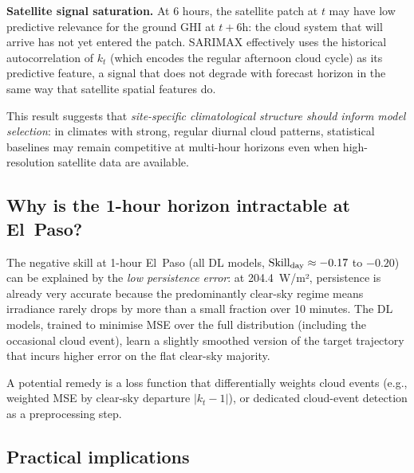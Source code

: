 \textbf{Satellite signal saturation.} At 6 hours, the satellite patch at $t$
may have low predictive relevance for the ground GHI at $t+6\text{h}$: the cloud
system that will arrive has not yet entered the patch. SARIMAX effectively uses
the historical autocorrelation of $k_t$ (which encodes the regular afternoon cloud
cycle) as its predictive feature, a signal that does not degrade with forecast
horizon in the same way that satellite spatial features do.

This result suggests that \emph{site-specific climatological structure should inform
model selection}: in climates with strong, regular diurnal cloud patterns,
statistical baselines may remain competitive at multi-hour horizons even when
high-resolution satellite data are available.

\subsection{Why is the 1-hour horizon intractable at El~Paso?}

The negative skill at 1-hour El~Paso (all DL models, $\text{Skill}_\text{day} \approx -0.17$
to $-0.20$) can be explained by the \emph{low persistence error}: at 204.4~W/m²,
persistence is already very accurate because the predominantly clear-sky regime
means irradiance rarely drops by more than a small fraction over 10 minutes.
The DL models, trained to minimise MSE over the full distribution (including
the occasional cloud event), learn a slightly smoothed version of the target
trajectory that incurs higher error on the flat clear-sky majority.

A potential remedy is a loss function that differentially weights cloud events
(e.g., weighted MSE by clear-sky departure $|k_t - 1|$), or dedicated cloud-event
detection as a preprocessing step.

\subsection{Practical implications}

